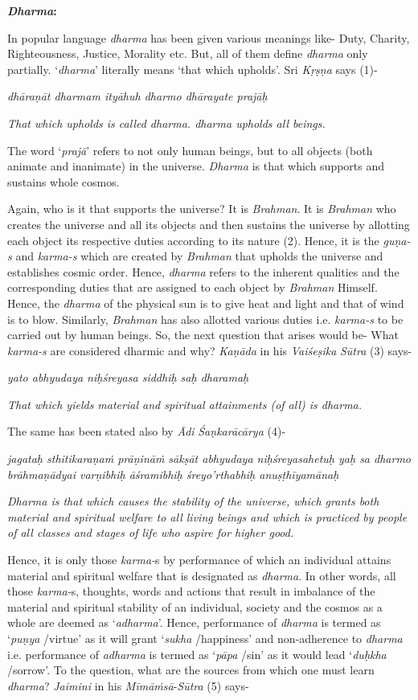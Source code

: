 \textbf{\emph{Dharma}:}

In popular language \emph{dharma} has been given various meanings like- Duty, Charity, Righteousness, Justice, Morality etc. But, all of them define \emph{dharma} only partially. `\emph{dharma}' literally means `that which upholds'. Sri \emph{Kṛṣṇa} says (1)-

\emph{dhāraṇāt dharmam ityāhuh dharmo dhārayate prajāḥ }

\emph{That which upholds is called dharma. dharma upholds all beings.}

The word `\emph{prajā}' refers to not only human beings, but to all objects (both animate and inanimate) in the universe. \emph{Dharma} is that which supports and sustains whole cosmos.

Again, who is it that supports the universe? It is \emph{Brahman}. It is \emph{Brahman} who creates the universe and all its objects and then sustains the universe by allotting each object its respective duties according to its nature (2). Hence, it is the \emph{guṇa-s} and \emph{karma-s} which are created by \emph{Brahman} that upholds the universe and establishes cosmic order. Hence, \emph{dharma} refers to the inherent qualities and the corresponding duties that are assigned to each object by \emph{Brahman} Himself. Hence, the \emph{dharma} of the physical sun is to give heat and light and that of wind is to blow. Similarly, \emph{Brahman} has also allotted various duties i.e. \emph{karma-s} to be carried out by human beings. So, the next question that arises would be- What \emph{karma-s} are considered dharmic and why? \emph{Kaṇāda} in his \emph{Vaiśeṣika} \emph{Sūtra} (3) says-

\emph{yato abhyudaya niḥśreyasa siddhiḥ saḥ dharamaḥ }

\emph{That which yields material and spiritual attainments (of all) is dharma.}

The same has been stated also by \emph{Ādi} \emph{Śaṇkarācārya} (4)-

\emph{jagataḥ sthitikaraṇaṁ prāṇināṁ sākṣāt abhyudaya niḥśreyasahetuḥ yaḥ sa dharmo brāhmaṇādyai varṇibhiḥ āśramibhiḥ śreyo'rthabhiḥ anuṣṭhīyamānaḥ }

\emph{Dharma is that which causes the stability of the universe, which grants both material and spiritual welfare to all living beings and which is practiced by people of all classes and stages of life who aspire for higher good. }

Hence, it is only those \emph{karma-}s by performance of which an individual attains material and spiritual welfare that is designated as \emph{dharma}. In other words, all those \emph{karma-}s, thoughts, words and actions that result in imbalance of the material and spiritual stability of an individual, society and the cosmos as a whole are deemed as `\emph{adharma}'. Hence, performance of \emph{dharma} is termed as `\emph{puṇya} /virtue' as it will grant `\emph{sukha} /happiness' and non-adherence to \emph{dharma} i.e. performance of \emph{adharma} is termed as `\emph{pāpa} /sin' as it would lead `\emph{duḥkha} /sorrow'. To the question, what are the sources from which one must learn \emph{dharma}? \emph{Jaimini} in his \emph{Mīmāṁsā}-\emph{Sūtra} (5) says-

